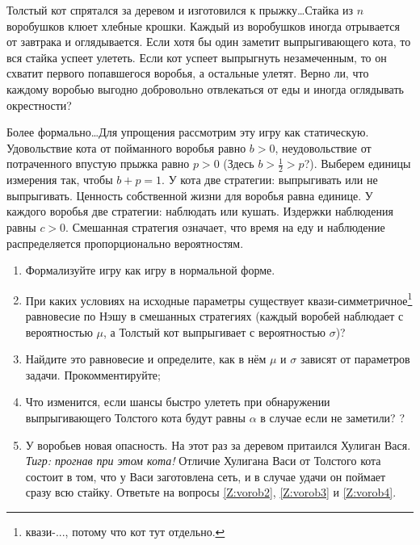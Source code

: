 \begin{problem}
Толстый кот спрятался за деревом и изготовился к прыжку\ldots Стайка из  $n$  воробушков клюет хлебные крошки. Каждый из воробушков иногда отрывается от завтрака и оглядывается. Если хотя бы один заметит выпрыгивающего кота, то вся стайка успеет улететь. Если кот успеет выпрыгнуть незамеченным, то он схватит первого попавшегося воробья, а остальные улетят. Верно ли, что каждому воробью выгодно добровольно отвлекаться от еды и иногда оглядывать окрестности?\par
Более формально\ldots Для упрощения рассмотрим эту игру как статическую. Удовольствие кота от пойманного воробья равно  $b>0$, неудовольствие от потраченного впустую прыжка равно $p>0$ ({\red Здесь $b > \frac{1}{2} > p$?}). Выберем единицы измерения так, чтобы  $b+p=1$. У кота две стратегии: выпрыгивать или не выпрыгивать.
Ценность собственной жизни для воробья равна единице. У каждого воробья две стратегии: наблюдать или кушать. Издержки наблюдения равны  $c>0$. Смешанная стратегия означает, что время на еду и наблюдение распределяется пропорционально вероятностям.
\begin{enumerate}
\item Формализуйте игру как игру в нормальной форме.
\item\label{Z:vorob2}  При каких условиях на исходные параметры существует квази-симметричное\footnote{квази-..., потому что кот тут отдельно.} равновесие по Нэшу в смешанных стратегиях (каждый воробей наблюдает с вероятностью  $\mu $, а Толстый кот выпрыгивает с вероятностью  $\sigma$)?\par
\item\label{Z:vorob3} Найдите это равновесие и определите, как в нём  $\mu $  и  $\sigma $  зависят от параметров задачи. Прокомментируйте;\par
\item\label{Z:vorob4}  Что изменится, если шансы быстро улететь при обнаружении выпрыгивающего Толстого кота будут равны $\alpha$ {\red  в случае если не заметили?} ?\par
\item У воробьев новая опасность. На этот раз за деревом притаился Хулиган Вася.  {\red \it Тигр: прогнав при этом кота!} Отличие Хулигана Васи от Толстого кота состоит в том, что у Васи заготовлена сеть, и в случае удачи он поймает сразу всю стайку. Ответьте на вопросы \ref{Z:vorob2}, \ref{Z:vorob3} и \ref{Z:vorob4}.
\end{enumerate}


\begin{sol}

\end{sol}
\end{problem}




